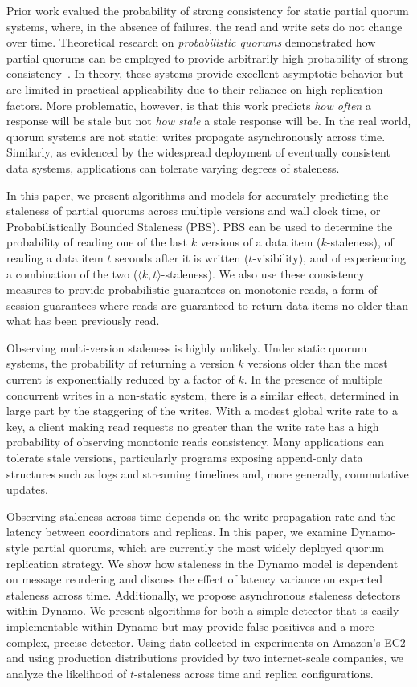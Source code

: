 \documentclass{vldb}
\begin{document}
Prior work evalued the probability of strong consistency for static
partial quorum systems, where, in the absence of failures, the read
and write sets do not change over time.  Theoretical research on
\textit{probabilistic quorums} demonstrated how partial quorums can be
employed to provide arbitrarily high probability of strong
consistency~\cite{prob-quorum}. In theory, these systems provide
excellent asymptotic behavior but are limited in practical
applicability due to their reliance on high replication factors.  More
problematic, however, is that this work predicts \textit{how often} a
response will be stale but not \textit{how stale} a stale response
will be. In the real world, quorum systems are not static: writes
propagate asynchronously across time. Similarly, as evidenced by the
widespread deployment of eventually consistent data systems,
applications can tolerate varying degrees of staleness.

In this paper, we present algorithms and models for accurately
predicting the staleness of partial quorums across multiple versions
and wall clock time, or Probabilistically Bounded Staleness (PBS). PBS
can be used to determine the probability of reading one of the last
$k$ versions of a data item ($k$-staleness), of reading a data item
$t$ seconds after it is written ($t$-visibility), and of experiencing
a combination of the two ($\langle k, t \rangle$-staleness).  We also use these
consistency measures to provide probabilistic guarantees on monotonic
reads, a form of session guarantees where reads are guaranteed to
return data items no older than what has been previously read.

Observing multi-version staleness is highly unlikely.  Under static
quorum systems, the probability of returning a version $k$ versions
older than the most current is exponentially reduced by a factor of
$k$.  In the presence of multiple concurrent writes in a non-static
system, there is a similar effect, determined in large part by the
staggering of the writes.  With a modest global write rate to a key, a
client making read requests no greater than the write rate has a high
probability of observing monotonic reads consistency.  Many
applications can tolerate stale versions, particularly programs
exposing append-only data structures such as logs and streaming
timelines and, more generally, commutative updates.

Observing staleness across time depends on the write propagation rate
and the latency between coordinators and replicas.  In this paper, we
examine Dynamo-style partial quorums, which are currently the most
widely deployed quorum replication strategy.  We show how staleness in
the Dynamo model is dependent on message reordering and discuss the
effect of latency variance on expected staleness across time.
Additionally, we propose asynchronous staleness detectors within
Dynamo.  We present algorithms for both a simple detector that is
easily implementable within Dynamo but may provide false positives and
a more complex, precise detector.  Using data collected in experiments
on Amazon's EC2 and using production distributions provided by two
internet-scale companies, we analyze the likelihood of $t$-staleness
across time and replica configurations.
\end{document}
